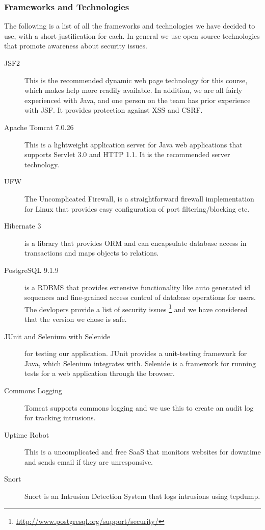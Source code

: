 \documentclass[a4paper]{article}
\begin{document}
\subsubsection{Frameworks and Technologies}
The following is a list of all the frameworks and technologies we have decided to use, with a short justification for each. In general we use open source technologies that promote awareness about security issues.
\begin{description}
\item[JSF2] This is the recommended dynamic web page technology for this course, which makes help more readily available. In addition, we are all fairly experienced with Java, and one person on the team has prior experience with JSF. It provides protection against XSS and CSRF. 
\item[Apache Tomcat 7.0.26] This is a lightweight application server for Java web applications that supports Servlet 3.0 and HTTP 1.1. It is the recommended server technology. 
\item[UFW] The Uncomplicated Firewall, is a straightforward firewall implementation for Linux that provides easy configuration of port filtering/blocking etc.
\item[Hibernate 3] is a library that provides ORM and can encapsulate database access in transactions and maps objects to relations.
\item[PostgreSQL 9.1.9] is a RDBMS that provides extensive functionality like auto generated id sequences and fine-grained access control of database operations for users. The devlopers provide a list of security issues \footnote{\href{http://www.postgresql.org/support/security/}{http://www.postgresql.org/support/security/}} and we have considered that the version we chose is safe.
\item[JUnit and Selenium with Selenide] for testing our application. JUnit provides a unit-testing framework for Java, which Selenium integrates with. Selenide is a framework for running tests for a web application through the browser.
\item[Commons Logging]
Tomcat supports commons logging and we use this to create an audit log for tracking intrusions.
\item[Uptime Robot] This is a uncomplicated and free SaaS that monitors websites for downtime and sends email if they are unresponsive.
\item[Snort] Snort is an Intrusion Detection System that logs intrusions using tcpdump.
\end{description}
\end{document}
